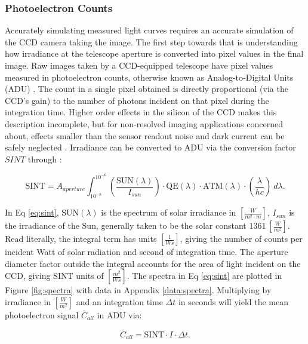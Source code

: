 \subsubsection{Photoelectron Counts}

Accurately simulating measured light curves requires an accurate simulation of the CCD camera taking the image. The first step towards that is understanding how irradiance at the telescope aperture is converted into pixel values in the final image. Raw images taken by a CCD-equipped telescope have pixel values measured in photoelectron counts, otherwise known as Analog-to-Digital Units (ADU) \cite{krag2003}. The count in a single
pixel obtained is directly proportional (via the CCD's gain) to the number of
photons incident on that pixel during the integration time. Higher order effects in the silicon of
the CCD makes this description incomplete, but for non-resolved imaging applications
concerned about, effects smaller than the sensor readout noise and dark current can be safely neglected
\cite{frueh2019notes}. Irradiance can be converted to ADU via the conversion factor $SINT$
through \cite{krag2003}:

\begin{equation} \label{eq:sint}
 \textrm{SINT} = A_{aperture}
	\int_{10^{-8}}^{10^{-6}}{ \left( \frac{\textrm{SUN}(\lambda)}{I_{sun}} \right) \cdot \textrm{QE}(\lambda) \cdot \textrm{ATM}(\lambda)
  \cdot \left( \frac{\lambda}{h c} \right) \: d\lambda}.
\end{equation}

In Eq \ref{eq:sint}, $\textrm{SUN}(\lambda)$ is the spectrum of solar irradiance in 
$\left[\frac{W}{m^2\cdot m} \right]$, $I_{sun}$ is the irradiance of the Sun, generally taken to be
the solar constant $1361 \: \left[ \frac{W}{m^2} \right]$. Read literally, the integral term has
units $\left[ \frac{1}{Ws} \right]$, giving the number of counts per incident Watt of solar
radiation and second of integration time. The aperture diameter factor outside the integral accounts
for the area of light incident on the CCD, giving $\textrm{SINT}$ units of $\left[ \frac{m^2}{Ws}
\right]$. The spectra in Eq \ref{eq:sint} are plotted in Figure \ref{fig:spectra} with data in Appendix \ref{data:spectra}. Multiplying by irradiance in $\left[ \frac{W}{m^2} \right]$ and an integration time $\Delta t$ 
in seconds will yield the mean photoelectron signal $\bar{C}_{all}$ in ADU via:

\begin{equation} \label{eq:irrad_to_count}
  \bar{C}_{all} = \textrm{SINT} \cdot I \cdot \Delta t.
\end{equation}

